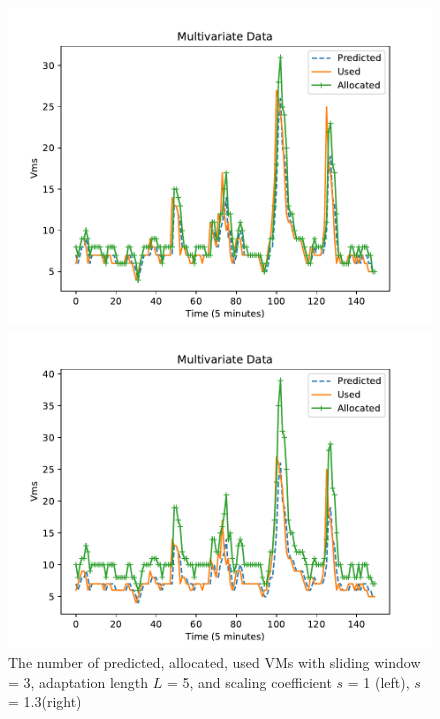 \documentclass[runningheads]{llncs}
\begin{document}
\begin{figure}[!h]
	\centering
	\begin{minipage}[t]{6cm}
		\centering
		\includegraphics[width=1\textwidth =0cm 0cm 0cm 0cm]{images/pdf/scaling/fl_bfonn_vms-s_10-L_5.pdf}
	\end{minipage}
	\begin{minipage}[t]{6cm}
		\centering
		\includegraphics[width=1\textwidth =0cm 0cm 0cm 0cm]{images/pdf/scaling/fl_bfonn_vms-s_13-L_5.pdf}
	\end{minipage}
	\caption{The number of predicted, allocated, used VMs with sliding window = 3, adaptation length $L$ = 5, and scaling coefficient $s$ = 1 (left), $s$ = 1.3(right)} 
	\label{fig_scaling_1013}
\end{figure}
\end{document}
